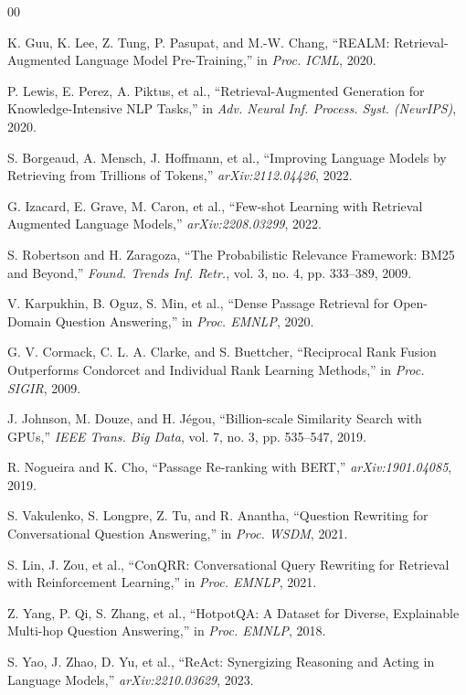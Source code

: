 \documentclass[conference]{IEEEtran}
\begin{document}
\begin{thebibliography}{00}

 K. Guu, K. Lee, Z. Tung, P. Pasupat, and M.-W. Chang, ``REALM: Retrieval-Augmented Language Model Pre-Training,'' in \textit{Proc. ICML}, 2020.

 P. Lewis, E. Perez, A. Piktus, et al., ``Retrieval-Augmented Generation for Knowledge-Intensive NLP Tasks,'' in \textit{Adv. Neural Inf. Process. Syst. (NeurIPS)}, 2020.

 S. Borgeaud, A. Mensch, J. Hoffmann, et al., ``Improving Language Models by Retrieving from Trillions of Tokens,'' \textit{arXiv:2112.04426}, 2022.

 G. Izacard, E. Grave, M. Caron, et al., ``Few-shot Learning with Retrieval Augmented Language Models,'' \textit{arXiv:2208.03299}, 2022.

 S. Robertson and H. Zaragoza, ``The Probabilistic Relevance Framework: BM25 and Beyond,'' \textit{Found. Trends Inf. Retr.}, vol. 3, no. 4, pp. 333--389, 2009.

 V. Karpukhin, B. Oguz, S. Min, et al., ``Dense Passage Retrieval for Open-Domain Question Answering,'' in \textit{Proc. EMNLP}, 2020.

 G. V. Cormack, C. L. A. Clarke, and S. Buettcher, ``Reciprocal Rank Fusion Outperforms Condorcet and Individual Rank Learning Methods,'' in \textit{Proc. SIGIR}, 2009.

 J. Johnson, M. Douze, and H. J\'egou, ``Billion-scale Similarity Search with GPUs,'' \textit{IEEE Trans. Big Data}, vol. 7, no. 3, pp. 535--547, 2019.

 R. Nogueira and K. Cho, ``Passage Re-ranking with BERT,'' \textit{arXiv:1901.04085}, 2019.

 S. Vakulenko, S. Longpre, Z. Tu, and R. Anantha, ``Question Rewriting for Conversational Question Answering,'' in \textit{Proc. WSDM}, 2021.

 S. Lin, J. Zou, et al., ``ConQRR: Conversational Query Rewriting for Retrieval with Reinforcement Learning,'' in \textit{Proc. EMNLP}, 2021.

 Z. Yang, P. Qi, S. Zhang, et al., ``HotpotQA: A Dataset for Diverse, Explainable Multi-hop Question Answering,'' in \textit{Proc. EMNLP}, 2018.

 S. Yao, J. Zhao, D. Yu, et al., ``ReAct: Synergizing Reasoning and Acting in Language Models,'' \textit{arXiv:2210.03629}, 2023.


\end{thebibliography}
\end{document}
